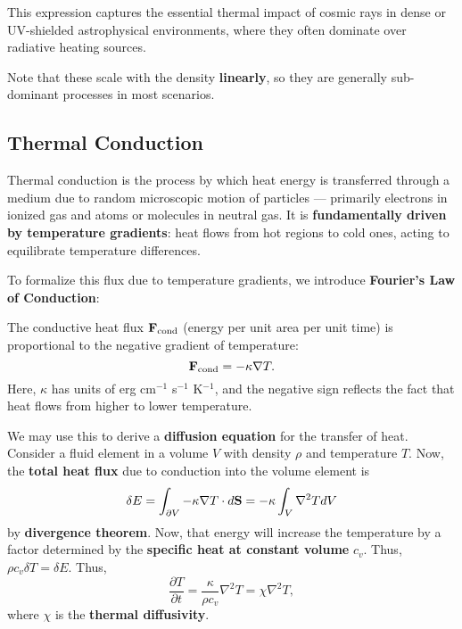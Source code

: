 This expression captures the essential thermal impact of cosmic rays in dense or UV-shielded astrophysical environments, where they often dominate over radiative heating sources.

\begin{ideabox}
    Note that these scale with the density \textbf{linearly}, so they are generally sub-dominant processes in most scenarios.
\end{ideabox}

\subsection{Thermal Conduction}

Thermal conduction is the process by which heat energy is transferred through a medium due to random microscopic motion of particles — primarily electrons in ionized gas and atoms or molecules in neutral gas. It is \textbf{fundamentally driven by temperature gradients}: heat flows from hot regions to cold ones, acting to equilibrate temperature differences.
\vspace{0.5cm}
\begin{proposition}
To formalize this flux due to temperature gradients, we introduce \textbf{Fourier's Law of Conduction}: 

The conductive heat flux \( \mathbf{F}_{\rm cond} \) (energy per unit area per unit time) is proportional to the negative gradient of temperature:
\[
\mathbf{F}_{\rm cond} = -\kappa \nabla T.
\]
Here, \( \kappa \) has units of erg cm\(^{-1}\) s\(^{-1}\) K\(^{-1} \), and the negative sign reflects the fact that heat flows from higher to lower temperature.
\end{proposition}
\vspace{0.5cm}
We may use this to derive a \textbf{diffusion equation} for the transfer of heat. Consider a fluid element in a volume $V$ with density $\rho$ and temperature $T$. Now, the \textbf{total heat flux} due to conduction into the volume element is
\[
\delta E = \int_{\partial V} -\kappa \nabla T \cdot d{\bf S} = -\kappa \int_V \nabla^2T dV
\]
by \textbf{divergence theorem}. Now, that energy will increase the temperature by a factor determined by the \textbf{specific heat at constant volume} $c_v$. Thus, $\rho c_v \delta T =  \delta E$. Thus,
\begin{equation}
    \label{eq:heat_equation}
    \boxed{
    \frac{\partial T}{\partial t} = \frac{\kappa}{\rho c_v} \nabla^2 T = \chi \nabla^2 T,
    }
\end{equation}
where $\chi$ is the \textbf{thermal diffusivity}. 

